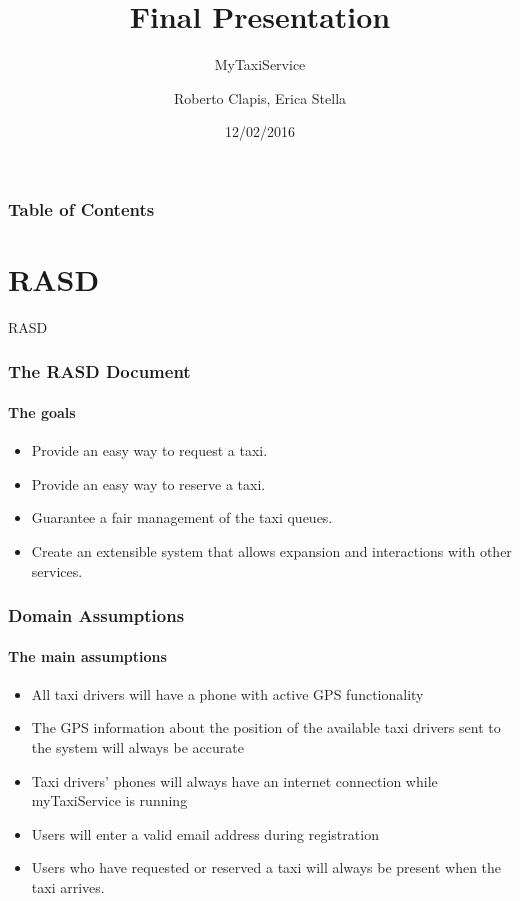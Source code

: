 \documentclass[10pt,xcolor={usenames,dvipsnames}]{beamer}
\title{Final Presentation}
\subtitle{MyTaxiService}
\author{Roberto Clapis, Erica Stella}
\institute{Politecnico di Milano}
\date{12/02/2016}
\begin{document}
\frame{\titlepage}
\begin{frame}
	\frametitle{Table of Contents}
	\tableofcontents[currentsection]
\end{frame}


\section[Section]{RASD}

\begin{frame}
	\begin{center}
		RASD	
	\end{center}
\end{frame}
\begin{frame}
	\frametitle{The RASD Document}
	\framesubtitle{The goals}
	\begin{itemize}
		\item Provide an easy way to request a taxi.
		\item Provide an easy way to reserve a taxi.
		\item Guarantee a fair management of the taxi queues.
		\item Create an extensible system that allows expansion and interactions with other services.
	\end{itemize}
\end{frame}
 \begin{frame}
	\frametitle{Domain Assumptions}
	\framesubtitle{The main assumptions}
	\begin{itemize}
		\item All taxi drivers will have a phone with active GPS functionality 
		\item The GPS information about the position of the available taxi drivers sent to the system will always be accurate
		\item Taxi drivers' phones will always have an internet connection while myTaxiService is running
		\item Users will enter a valid email address during registration 
		\item Users who have requested or reserved a taxi will always be present when the taxi arrives.
	\end{itemize}
\end{frame}
\end{document}

